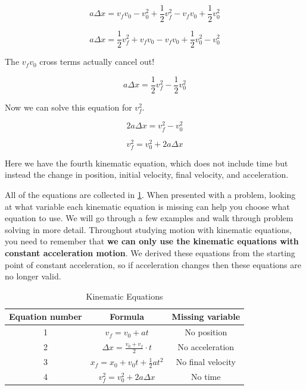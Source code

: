 \documentclass[12pt]{book}
\begin{document}
\begin{equation}
a \Delta x = v_f v_0 - v_0^2 + \frac{1}{2} v_f^2 - v_f v_0 + \frac{1}{2} v_0^2
\end{equation}

\begin{equation}
a \Delta x = \frac{1}{2} v_f^2 + v_f v_0 - v_f v_0 + \frac{1}{2} v_0^2 - v_0^2
\end{equation}

The $v_f v_0$ cross terms actually cancel out!

\begin{equation}
a \Delta x = \frac{1}{2} v_f^2 - \frac{1}{2} v_0^2
\end{equation}

Now we can solve this equation for $v_f^2$.

\begin{equation}
2 a \Delta x	 = v_f^2 - v_0^2
\end{equation}

\begin{equation}
v_f^2 = v_0^2 + 2 a \Delta x
\label{km4}
\end{equation}

Here we have the fourth kinematic equation, which does not include time but instead the change in position, initial velocity, final velocity, and acceleration.

All of the equations are collected in \ref{kmtable}. When presented with a problem, looking at what variable each kinematic equation is missing can help you choose what equation to use. We will go through a few examples and walk through problem solving in more detail. Throughout studying motion with kinematic equations, you need to remember that \textbf{we can only use the kinematic equations with constant acceleration motion}. We derived these equations from the starting point of constant acceleration, so if acceleration changes then these equations are no longer valid. 

\begin{table}[b]
\large
\centering
\caption{Kinematic Equations}
\label{kmtable}
\begin{tabular}{| c | c | c |}
	\hline
	Equation number & Formula & Missing variable \\
	\hline
	1 & $v_f = v_0 + at$ & No position \\[5pt] \hline
	2 & $\Delta x = \frac{v_0 + v_f}{2} \cdot t$ & No acceleration \\[5pt] \hline
	3 & $x_f = x_0 + v_0 t + \frac{1}{2} a t^2$ & No final velocity \\[5pt] \hline
	4 & $v_f^2 = v_0^2 + 2 a \Delta x$ & No time \\[5pt]
	\hline
\end{tabular}
\end{table}
\end{document}
